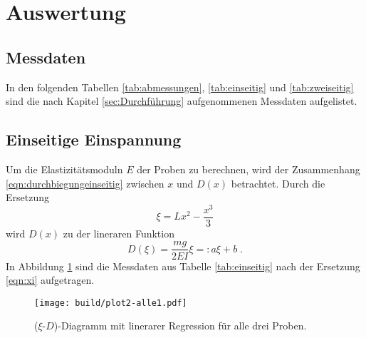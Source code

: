 \section{Auswertung}
\label{sec:Auswertung}
\subsection{Messdaten}
\label{sec:mess}
In den folgenden Tabellen \ref{tab:abmessungen}, \ref{tab:einseitig} und \ref{tab:zweiseitig} sind die nach Kapitel
\ref{sec:Durchführung} aufgenommenen Messdaten aufgelistet.



\subsection{Einseitige Einspannung}
\label{sec:einseitig}
Um die Elastizitätsmoduln $E$ der Proben zu berechnen, wird der Zusammenhang \eqref{eqn:durchbiegungeinseitig} zwischen $x$ und $D(x)$ betrachtet. Durch die Ersetzung
\begin{equation}
    \xi=Lx^2-\frac{x^3}{3}
    \label{eqn:xi}
\end{equation}
wird $D(x)$ zu der lineraren Funktion
\begin{equation}
    D(\xi)=\frac{mg}{2EI}\xi=:a\xi+b \;.
    \label{eqn:D(xi)}
\end{equation}
In Abbildung \ref{fig:einseitig} sind die Messdaten aus Tabelle \ref{tab:einseitig} nach der Ersetzung \eqref{eqn:xi} aufgetragen.

\begin{figure}[H]
    \centering
    \texttt{[image: build/plot2-alle1.pdf]}
    \caption{($\xi$-$D$)-Diagramm mit linerarer Regression für alle drei Proben.}
    \label{fig:einseitig}
\end{figure}

